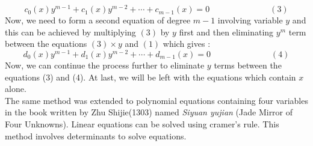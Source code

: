 \documentclass[a4paper,reqno,11pt]{amsart}
\theoremstyle{plain}%
\theoremstyle{definition}
\theoremstyle{remark}
\begin{document}
$$c_{0}(x)y^{m-1} + c_{1}(x)y^{m-2} + \cdots + c_{m-1}(x) = 0 \hspace{3cm} (3)$$
Now, we need to form a second equation of degree $m−1$ involving variable $y$ and this can be achieved by multiplying $(3)$ by
$y$ first and then eliminating $y^m$ term between the equations $(3) \times y$ and $(1)$ which gives :\\
$$d_{0}(x)y^{m-1} + d_{1}(x)y^{m-2} + \cdots + d_{m-1}(x) = 0 \hspace{3cm} (4)$$
Now, we can continue the process further to eliminate $y$ terms between the equations (3) and (4). At last, we will be left with the equations which contain $x$ alone.\\ \indent The same method
was extended to polynomial equations containing four variables in the book written by Zhu Shijie(1303) named
\textit{Siyuan yujian} (Jade Mirror of Four Unknowns).
Linear equations can be solved using cramer's rule. This method involves determinants to solve equations.\\
\\
\end{document}
